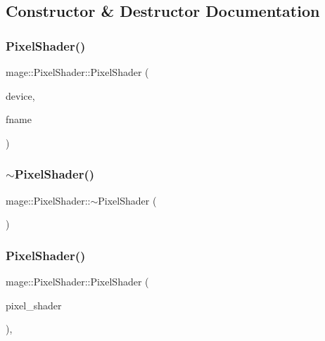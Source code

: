 \subsection{Constructor \& Destructor Documentation}
\hypertarget{classmage_1_1_pixel_shader_ab481009e170eb405a962ad177d86c3ae}{}\label{classmage_1_1_pixel_shader_ab481009e170eb405a962ad177d86c3ae} 
\subsubsection{\texorpdfstring{Pixel\+Shader()}{PixelShader()}\hspace{0.1cm}{\footnotesize\ttfamily [1/2]}}
{\footnotesize\ttfamily mage\+::\+Pixel\+Shader\+::\+Pixel\+Shader (\begin{DoxyParamCaption}\item[{I\+D3\+D11\+Device2 $\ast$}]{device,  }\item[{const wstring \&}]{fname }\end{DoxyParamCaption})}

\hypertarget{classmage_1_1_pixel_shader_aac21a59d5d614f5bf1905f01479de44e}{}\label{classmage_1_1_pixel_shader_aac21a59d5d614f5bf1905f01479de44e} 
\subsubsection{\texorpdfstring{$\sim$\+Pixel\+Shader()}{~PixelShader()}}
{\footnotesize\ttfamily mage\+::\+Pixel\+Shader\+::$\sim$\+Pixel\+Shader (\begin{DoxyParamCaption}{ }\end{DoxyParamCaption})\hspace{0.3cm}{\ttfamily [virtual]}}

\hypertarget{classmage_1_1_pixel_shader_a361df943e40e9015ac4b769af130ce79}{}\label{classmage_1_1_pixel_shader_a361df943e40e9015ac4b769af130ce79} 
\subsubsection{\texorpdfstring{Pixel\+Shader()}{PixelShader()}\hspace{0.1cm}{\footnotesize\ttfamily [2/2]}}
{\footnotesize\ttfamily mage\+::\+Pixel\+Shader\+::\+Pixel\+Shader (\begin{DoxyParamCaption}\item[{const \hyperlink{classmage_1_1_pixel_shader}{Pixel\+Shader} \&}]{pixel\+\_\+shader }\end{DoxyParamCaption})\hspace{0.3cm}{\ttfamily [private]}, {\ttfamily [delete]}}



